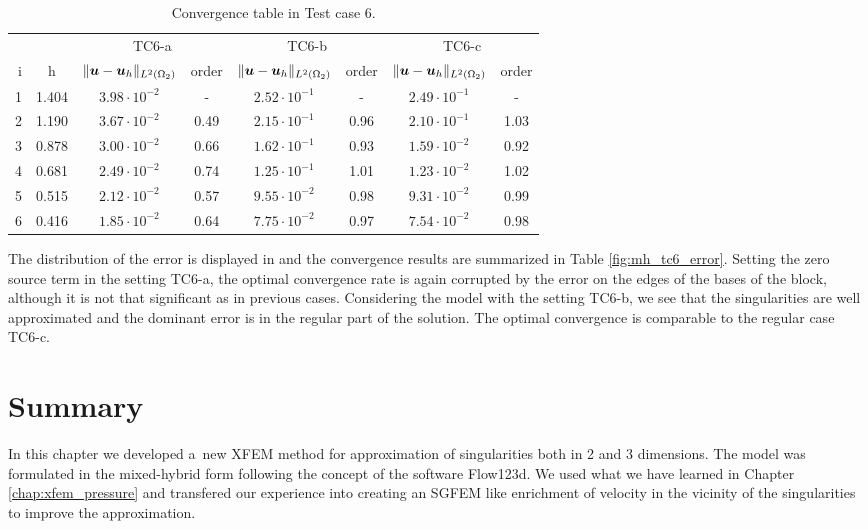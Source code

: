 \begin{table}[!htb]
\begin{center}
\bgroup
\def\arraystretch{1.2}
\setlength\tabcolsep{5pt}
\begin{tabular}{rc|cc|cc|cc}
\toprule
\multicolumn{2}{c|}{} & \multicolumn{2}{c|}{ TC6-a } & \multicolumn{2}{c|}{ TC6-b } & \multicolumn{2}{c}{TC6-c}\\ [3pt] %
i & h & $\|\mathbf{\boldsymbol{u}}-\mathbf{\boldsymbol{u}}_h\|_{L^2(\Omega_2)}$ & order & $\|\mathbf{\boldsymbol{u}}-\mathbf{\boldsymbol{u}}_h\|_{L^2(\Omega_2)}$
    & order & $\|\mathbf{\boldsymbol{u}}-\mathbf{\boldsymbol{u}}_h\|_{L^2(\Omega_2)}$ & order \\ [3pt] \midrule
1 & 1.404 &  $3.98\cdot10^{-2}$  &  -   &  $2.52\cdot10^{-1}$  &  -   &  $2.49\cdot10^{-1}$ &   -   \\
2 & 1.190 &  $3.67\cdot10^{-2}$  & 0.49 &  $2.15\cdot10^{-1}$  & 0.96 &  $2.10\cdot10^{-1}$ &  1.03 \\
3 & 0.878 &  $3.00\cdot10^{-2}$  & 0.66 &  $1.62\cdot10^{-1}$  & 0.93 &  $1.59\cdot10^{-2}$ &  0.92 \\
4 & 0.681 &  $2.49\cdot10^{-2}$  & 0.74 &  $1.25\cdot10^{-1}$  & 1.01 &  $1.23\cdot10^{-2}$ &  1.02 \\
5 & 0.515 &  $2.12\cdot10^{-2}$  & 0.57 &  $9.55\cdot10^{-2}$  & 0.98 &  $9.31\cdot10^{-2}$ &  0.99 \\
6 & 0.416 &  $1.85\cdot10^{-2}$  & 0.64 &  $7.75\cdot10^{-2}$  & 0.97 &  $7.54\cdot10^{-2}$ &  0.98 \\
\bottomrule
\end{tabular}
\caption{Convergence table in Test case 6.}
\label{tab:mh_tc6_convergence}
\egroup
\end{center}
\end{table}

The distribution of the error is displayed in 
and the convergence results are summarized in Table \ref{fig:mh_tc6_error}.
Setting the zero source term in the setting TC6-a, the optimal convergence rate is again corrupted by the error on the edges of the bases of the block,
although it is not that significant as in previous cases.
Considering the model with the setting TC6-b, we see that the singularities are well approximated
and the dominant error is in the regular part of the solution. The optimal convergence is comparable to the regular case TC6-c.

\section{Summary}
In this chapter we developed a~new XFEM method for approximation of singularities both in 2 and 3 dimensions.
The model was formulated in the mixed-hybrid form following the concept of the software Flow123d.
We used what we have learned in Chapter \ref{chap:xfem_pressure} and transfered our experience into creating
an SGFEM like enrichment of velocity in the vicinity of the singularities to improve the approximation.

